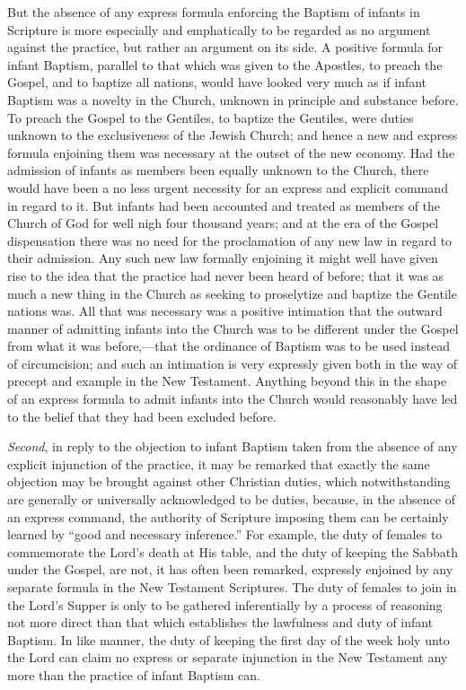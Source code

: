 \documentclass[
  english,
]{book}
\begin{document}
But the absence of any express formula enforcing the Baptism of infants in Scripture is more especially and emphatically to be regarded as no argument against the practice, but rather an argument on its side. A positive formula for infant Baptism, parallel to that which was given to the Apostles, to preach the Gospel, and to baptize all nations, would have looked very much as if infant Baptism was a novelty in the Church, unknown in principle and substance before. To preach the Gospel to the Gentiles, to baptize the Gentiles, were duties unknown to the exclusiveness of the Jewish Church; and hence a new and express formula enjoining them was necessary at the outset of the new economy. Had the admission of infants as members been equally unknown to the Church, there would have been a no less urgent necessity for an express and explicit command in regard to it. But infants had been accounted and treated as members of the Church of God for well nigh four thousand years; and at the era of the Gospel dispensation there was no need for the proclamation of any new law in regard to their admission. Any such new law formally enjoining it might well have given rise to the idea that the practice had never been heard of before; that it was as much a new thing in the Church as seeking to proselytize and baptize the Gentile nations was. All that was necessary was a positive intimation that the outward manner of admitting infants into the Church was to be different under the Gospel from what it was before,---that the ordinance of Baptism was to be used instead of circumcision; and such an intimation is very expressly given both in the way of precept and example in the New Testament. Anything beyond this in the shape of an express formula to admit infants into the Church would reasonably have led to the belief that they had been excluded before.

\emph{Second}, in reply to the objection to infant Baptism taken from the absence of any explicit injunction of the practice, it may be remarked that exactly the same objection may be brought against other Christian duties, which notwithstanding are generally or universally acknowledged to be duties, because, in the absence of an express command, the authority of Scripture imposing them can be certainly learned by ``good and necessary inference.'' For example, the duty of females to commemorate the Lord's death at His table, and the duty of keeping the Sabbath under the Gospel, are not, it has often been remarked, expressly enjoined by any separate formula in the New Testament Scriptures. The duty of females to join in the Lord's Supper is only to be gathered inferentially by a process of reasoning not more direct than that which establishes the lawfulness and duty of infant Baptism. In like manner, the duty of keeping the first day of the week holy unto the Lord can claim no express or separate injunction in the New Testament any more than the practice of infant Baptism can.
\end{document}
